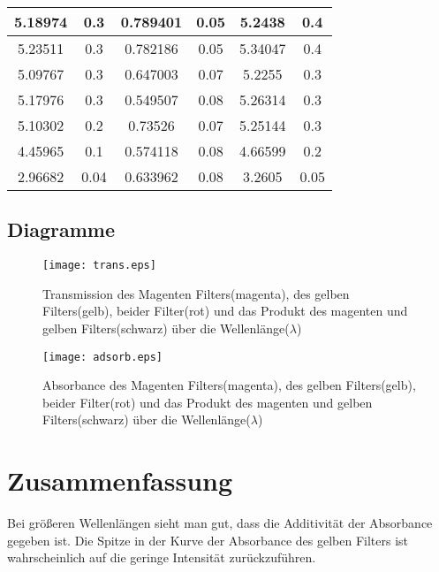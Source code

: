 \documentclass[a4paper]{article}
\begin{document}
\begin{table}[ht]
\begin{tabular}{|c|c|c|c|c|c|}
 5.18974 & 0.3&     0.789401 & 0.05&  5.2438 & 0.4\\\hline
 5.23511 & 0.3&     0.782186 & 0.05&  5.34047 & 0.4\\\hline
 5.09767 & 0.3&     0.647003 & 0.07&  5.2255 & 0.3\\\hline
 5.17976 & 0.3&     0.549507 & 0.08&  5.26314 & 0.3\\\hline
 5.10302 & 0.2&     0.73526 & 0.07&   5.25144 & 0.3\\\hline
 4.45965 & 0.1&     0.574118 & 0.08&  4.66599 & 0.2\\\hline
 2.96682 & 0.04&     0.633962 & 0.08& 3.2605 & 0.05\\  \hline
  \end{tabular}
  \label{tab:adsorb}
\end{table}

\newpage
\subsection{Diagramme}

\begin{figure}[ht]
  \begin{center}
    \texttt{[image: trans.eps]}
  \end{center}
  \caption{Transmission des Magenten Filters(magenta), des gelben Filters(gelb), beider Filter(rot) und das Produkt des magenten und gelben Filters(schwarz) über die Wellenlänge($\lambda$)}
  \label{fig:trans}
\end{figure}


\begin{figure}[ht]
  \begin{center}
    \texttt{[image: adsorb.eps]}
  \end{center}
  \caption{Absorbance des Magenten Filters(magenta), des gelben Filters(gelb), beider Filter(rot) und das Produkt des magenten und gelben Filters(schwarz) über die Wellenlänge($\lambda$) }
  \label{fig:adsob}
\end{figure}

\section{Zusammenfassung}
Bei größeren Wellenlängen sieht man gut, dass die Additivität der Absorbance gegeben ist. Die Spitze in der Kurve der Absorbance des gelben Filters ist wahrscheinlich auf die geringe Intensität zurückzuführen.
\end{document}
